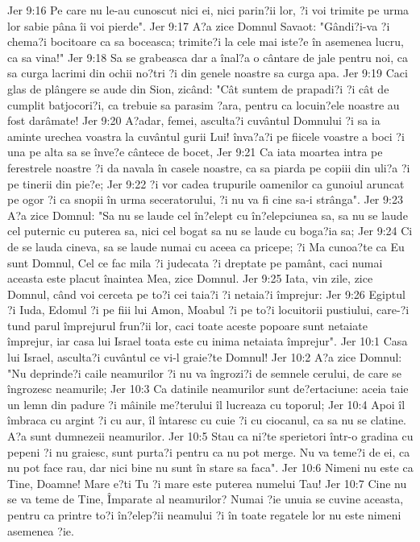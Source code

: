 Jer 9:16  Pe care nu le-au cunoscut nici ei, nici parin?ii lor, ?i voi trimite pe urma lor sabie pâna îi voi pierde".
Jer 9:17  A?a zice Domnul Savaot: "Gândi?i-va ?i chema?i bocitoare ca sa boceasca; trimite?i la cele mai iste?e în asemenea lucru, ca sa vina!"
Jer 9:18  Sa se grabeasca dar a înal?a o cântare de jale pentru noi, ca sa curga lacrimi din ochii no?tri ?i din genele noastre sa curga apa.
Jer 9:19  Caci glas de plângere se aude din Sion, zicând: "Cât suntem de prapadi?i ?i cât de cumplit batjocori?i, ca trebuie sa parasim ?ara, pentru ca locuin?ele noastre au fost darâmate!
Jer 9:20  A?adar, femei, asculta?i cuvântul Domnului ?i sa ia aminte urechea voastra la cuvântul gurii Lui! înva?a?i pe fiicele voastre a boci ?i una pe alta sa se înve?e cântece de bocet,
Jer 9:21  Ca iata moartea intra pe ferestrele noastre ?i da navala în casele noastre, ca sa piarda pe copiii din uli?a ?i pe tinerii din pie?e;
Jer 9:22  ?i vor cadea trupurile oamenilor ca gunoiul aruncat pe ogor ?i ca snopii în urma seceratorului, ?i nu va fi cine sa-i strânga".
Jer 9:23  A?a zice Domnul: "Sa nu se laude cel în?elept cu în?elepciunea sa, sa nu se laude cel puternic cu puterea sa, nici cel bogat sa nu se laude cu boga?ia sa;
Jer 9:24  Ci de se lauda cineva, sa se laude numai cu aceea ca pricepe; ?i Ma cunoa?te ca Eu sunt Domnul, Cel ce fac mila ?i judecata ?i dreptate pe pamânt, caci numai aceasta este placut înaintea Mea, zice Domnul.
Jer 9:25  Iata, vin zile, zice Domnul, când voi cerceta pe to?i cei taia?i ?i netaia?i împrejur:
Jer 9:26  Egiptul ?i Iuda, Edomul ?i pe fiii lui Amon, Moabul ?i pe to?i locuitorii pustiului, care-?i tund parul împrejurul frun?ii lor, caci toate aceste popoare sunt netaiate împrejur, iar casa lui Israel toata este cu inima netaiata împrejur".
Jer 10:1  Casa lui Israel, asculta?i cuvântul ce vi-l graie?te Domnul!
Jer 10:2  A?a zice Domnul: "Nu deprinde?i caile neamurilor ?i nu va îngrozi?i de semnele cerului, de care se îngrozesc neamurile;
Jer 10:3  Ca datinile neamurilor sunt de?ertaciune: aceia taie un lemn din padure ?i mâinile me?terului îl lucreaza cu toporul;
Jer 10:4  Apoi îl îmbraca cu argint ?i cu aur, îl întaresc cu cuie ?i cu ciocanul, ca sa nu se clatine. A?a sunt dumnezeii neamurilor.
Jer 10:5  Stau ca ni?te sperietori într-o gradina cu pepeni ?i nu graiesc, sunt purta?i pentru ca nu pot merge. Nu va teme?i de ei, ca nu pot face rau, dar nici bine nu sunt în stare sa faca".
Jer 10:6  Nimeni nu este ca Tine, Doamne! Mare e?ti Tu ?i mare este puterea numelui Tau!
Jer 10:7  Cine nu se va teme de Tine, Împarate al neamurilor? Numai ?ie unuia se cuvine aceasta, pentru ca printre to?i în?elep?ii neamului ?i în toate regatele lor nu este nimeni asemenea ?ie.
